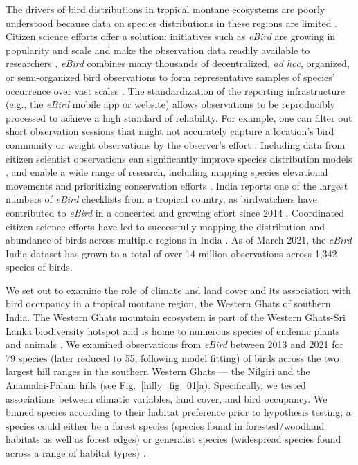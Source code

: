 The drivers of bird distributions in tropical montane ecosystems are poorly understood because data on species distributions in these regions are limited \citep{payne2017,peters2019}.
Citizen science efforts offer a solution: initiatives such as \textit{eBird} are growing in popularity and scale and make the observation data readily available to researchers \citep{sullivan2014}.
\textit{eBird} combines many thousands of decentralized, \textit{ad hoc}, organized, or semi-organized bird observations to form representative samples of species' occurrence over vast scales \citep{sullivan2009,sullivan2014,wood2011a}.
The standardization of the reporting infrastructure (e.g., the \textit{eBird} mobile app or website) allows observations to be reproducibly processed to achieve a high standard of reliability.
For example, one can filter out short observation sessions that might not accurately capture a location's bird community or weight observations by the observer's effort \citep{kelling2015a,johnston2018,johnston2021}.
Including data from citizen scientist observations can significantly improve species distribution models \citep{robinson2020}, and enable a wide range of research, including mapping species elevational movements \citep{tsai2020} and prioritizing conservation efforts \citep{vanstrien2013,fink2014,johnston2015}.
India reports one of the largest numbers of \textit{eBird} checklists from a tropical country, as birdwatchers have contributed to \textit{eBird} in a concerted and growing effort since 2014 \citep{viswanathan2020}.
Coordinated citizen science efforts have led to successfully mapping the distribution and abundance of birds across multiple regions in India \citep[e.g. the Mysore Bird Atlas, and the Kerala Bird Atlas][]{praveenj2021}.
As of March 2021, the \textit{eBird} India dataset has grown to a total of over 14 million observations across 1,342 species of birds.

We set out to examine the role of climate and land cover and its association with bird occupancy in a tropical montane region, the Western Ghats of southern India.
The Western Ghats mountain ecosystem is part of the Western Ghats-Sri Lanka biodiversity hotspot and is home to numerous species of endemic plants and animals \citep{myers2000,das2006}.
We examined observations from \textit{eBird} between 2013 and 2021 for 79 species (later reduced to 55, following model fitting) of birds across the two largest hill ranges in the southern Western Ghats --- the Nilgiri and the Anamalai-Palani hills (see Fig.~\ref{hilly_fig_01}a).
Specifically, we tested associations between climatic variables, land cover, and bird occupancy.
We binned species according to their habitat preference prior to hypothesis testing; a species could either be a forest species (species found in forested/woodland habitats as well as forest edges) or generalist species (widespread species found across a range of habitat types) \citep{ali1983}.

